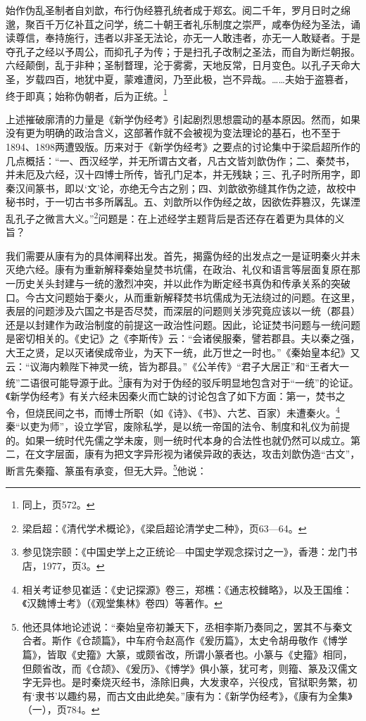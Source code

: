 \documentclass[a4paper, 12pt, openright]{ctexbook}
\renewenvironment{quote}
  {\list{}{\rightmargin2\ccwd \leftmargin2\ccwd \itemindent=2\ccwd \listparindent=2\ccwd}%
   \item\relax\small\kaishu\color{black}}
  {\endlist}
\begin{document}
\begin{quote}
始作伪乱圣制者自刘歆，布行伪经篡孔统者成于郑玄。阅二千年，罗月日时之绵邈，聚百千万亿补苴之问学，统二十朝王者礼乐制度之崇严，咸奉伪经为圣法，诵读尊信，奉持施行，违者以非圣无法论，亦无一人敢违者，亦无一人敢疑者。于是夺孔子之经以予周公，而抑孔子为传；于是扫孔子改制之圣法，而自为断烂朝报。六经颠倒，乱于非种；圣制瞀理，沦于雾雾，天地反常，日月变色。以孔子天命大圣，岁载四百，地犹中夏，蒙难遭闵，乃至此极，岂不异哉。……夫始于盗篡者，终于即真；始称伪朝者，后为正统。\footnote{同上，页572。}
\end{quote}

上述摧破廓清的力量是《新学伪经考》引起剧烈思想震动的基本原因。然而，如果没有更为明确的政治含义，这部著作就不会被视为变法理论的基石，也不至于1894、1898两遭毁版。历来对于《新学伪经考》之要点的讨论集中于梁启超所作的几点概括：“一、西汉经学，并无所谓古文者，凡古文皆刘歆伪作；二、秦焚书，并未厄及六经，汉十四博士所传，皆孔门足本，并无残缺；三、孔子时所用字，即秦汉间篆书，即以‘文’论，亦绝无今古之别；四、刘歆欲弥缝其作伪之迹，故校中秘书时，于一切古书多所羼乱。五、刘歆所以作伪经之故，因欲佐莽篡汉，先谋湮乱孔子之微言大义。”\footnote{梁启超：《清代学术概论》，《梁启超论清学史二种》，页63—64。}问题是：在上述经学主题背后是否还存在着更为具体的义旨？

我们需要从康有为的具体阐释出发。首先，揭露伪经的出发点之一是证明秦火并未灭绝六经。康有为重新解释秦始皇焚书坑儒，在政治、礼仪和语言等层面复原在那一历史关头封建与一统的激烈冲突，并以此作为断定经书真伪和传承关系的突破口。今古文问题始于秦火，从而重新解释焚书坑儒成为无法绕过的问题。在这里，表层的问题涉及六国之书是否尽焚，而深层的问题则关涉究竟应该以一统（郡县）还是以封建作为政治制度的前提这一政治性问题。因此，论证焚书问题与一统问题是密切相关的。《史记》之《李斯传》云：“会诸侯服秦，譬若郡县。夫以秦之强，大王之贤，足以灭诸侯成帝业，为天下一统，此万世之一时也。”《秦始皇本纪》又云：“议海内赖陛下神灵一统，皆为郡县。”《公羊传》“君子大居正”和“王者大一统”二语很可能导源于此。\footnote{参见饶宗颐：《中国史学上之正统论—中国史学观念探讨之一》，香港：龙门书店，1977，页3。}康有为对于伪经的驳斥明显地包含对于“一统”的论证。《新学伪经考》有关六经未因秦火而亡缺的讨论包含了如下方面：第一，焚书之令，但烧民间之书，而博士所职（如《诗》、《书》、六艺、百家）未遭秦火。\footnote{相关考证参见崔适：《史记探源》卷三，郑樵：《通志校雠略》，以及王国维：《汉魏博士考》（《观堂集林》卷四）等著作。}秦“以吏为师”，设立学官，废除私学，是以统一帝国的法令、制度和礼仪为前提的。如果一统时代先儒之学未废，则一统时代本身的合法性也就仍然可以成立。第二，在文字层面，康有为把文字异形视为诸侯异政的表达，攻击刘歆伪造“古文”，断言先秦籀、篆虽有承变，但无大异。\footnote{他还具体地论述说：“秦始皇帝初兼天下，丞相李斯乃奏同之，罢其不与秦文合者。斯作《仓颉篇》，中车府令赵高作《爰历篇》，太史令胡毋敬作《博学篇》，皆取《史籀》大篆，或颇省改，所谓小篆者也。小篆与《史籀》相同，但颇省改，而《仓颉》、《爰历》、《博学》俱小篆，犹可考，则籀、篆及汉儒文字无异也。是时秦烧灭经书，涤除旧典，大发隶卒，兴役戍，官狱职务繁，初有‘隶书’以趣约易，而古文由此绝矣。”康有为：《新学伪经考》，《康有为全集》（一），页784。}他说：
\end{document}
